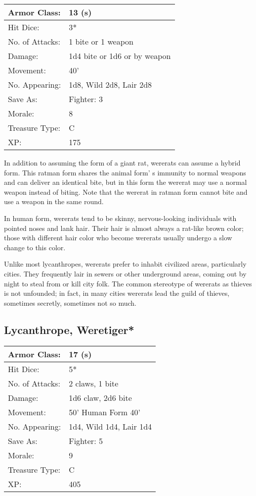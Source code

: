 \documentclass[a4paper,twoside,openany,10pt]{book}
\begin{document}
\begin{multicols}{2}
\begin{tabularx}{0.50\textwidth}{@{}lX@{}}
Armor Class: & 13 (s) \\\hline
Hit Dice: & 3* \\\hline
No. of Attacks: & 1 bite or 1 weapon \\\hline
Damage: & 1d4 bite or 1d6 or by weapon \\\hline
Movement: & 40' \\\hline
No. Appearing: & 1d8, Wild 2d8, Lair 2d8 \\\hline
Save As: & Fighter: 3 \\\hline
Morale: & 8 \\\hline
Treasure Type: & C \\\hline
XP: & 175 \\\hline
\end{tabularx}\medskip

In addition to assuming the form of a giant rat, wererats can assume a hybrid form. This ratman form shares the animal form' s immunity to normal weapons and can deliver an identical bite, but in this form the wererat may use a normal weapon instead of biting. Note that the wererat in ratman form cannot bite and use a weapon in the same round.

In human form, wererats tend to be skinny, nervous-looking individuals with pointed noses and lank hair. Their hair is almost always a rat-like brown color; those with different hair color who become wererats usually undergo a slow change to this color.

Unlike most lycanthropes, wererats prefer to inhabit civilized areas, particularly cities. They frequently lair in sewers or other underground areas, coming out by night to steal from or kill city folk. The common stereotype of wererats as thieves is not unfounded; in fact, in many cities wererats lead the guild of thieves, sometimes secretly, sometimes not so much.

\subsection*{Lycanthrope, Weretiger*}\label{lycanthrope-weretiger}

\begin{tabularx}{0.50\textwidth}{@{}lX@{}}
Armor Class: & 17 (s) \\\hline
Hit Dice: & 5* \\\hline
No. of Attacks: & 2 claws, 1 bite \\\hline
Damage: & 1d6 claw, 2d6 bite \\\hline
Movement: & 50' Human Form 40' \\\hline
No. Appearing: & 1d4, Wild 1d4, Lair 1d4 \\\hline
Save As: & Fighter: 5 \\\hline
Morale: & 9 \\\hline
Treasure Type: & C \\\hline
XP: & 405 \\\hline
\end{tabularx}\medskip


\end{multicols}
\end{document}
